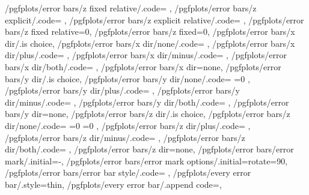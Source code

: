 {	/pgfplots/error bars/z fixed relative/.code=		\def\pgfplots@errorbars@zrel{#1}\def\pgfplots@errorbars@zmode{1},
	/pgfplots/error bars/z explicit/.code=			\def\pgfplots@errorbars@zmode{2},
	/pgfplots/error bars/z explicit relative/.code=	\def\pgfplots@errorbars@zmode{3},
	/pgfplots/error bars/z fixed relative=0,
	/pgfplots/error bars/z fixed=0,
	/pgfplots/error bars/x dir/.is choice,
	/pgfplots/error bars/x dir/none/.code={%
		\def\pgfplots@errorbars@xdirection{0}%
		\ifnum{}
			\ifnum{}
				\pgfplots@errorbars@enabledfalse
			\fi
		\fi
	},
	/pgfplots/error bars/x dir/plus/.code=				\def\pgfplots@errorbars@xdirection{1}\pgfplots@errorbars@enabledtrue,
	/pgfplots/error bars/x dir/minus/.code=				\def\pgfplots@errorbars@xdirection{2}\pgfplots@errorbars@enabledtrue,
	/pgfplots/error bars/x dir/both/.code=				\def\pgfplots@errorbars@xdirection{3}\pgfplots@errorbars@enabledtrue,
	/pgfplots/error bars/x dir=none,
	/pgfplots/error bars/y dir/.is choice,
	/pgfplots/error bars/y dir/none/.code={%
		\def\pgfplots@errorbars@ydirection{0}%
		\ifnum\pgfplots@errorbars@xdirection=0
			\ifnum{}
				\pgfplots@errorbars@enabledfalse
			\fi
		\fi
	},
	/pgfplots/error bars/y dir/plus/.code=				\def\pgfplots@errorbars@ydirection{1}\pgfplots@errorbars@enabledtrue,
	/pgfplots/error bars/y dir/minus/.code=				\def\pgfplots@errorbars@ydirection{2}\pgfplots@errorbars@enabledtrue,
	/pgfplots/error bars/y dir/both/.code=				\def\pgfplots@errorbars@ydirection{3}\pgfplots@errorbars@enabledtrue,
	/pgfplots/error bars/y dir=none,
	/pgfplots/error bars/z dir/.is choice,
	/pgfplots/error bars/z dir/none/.code={%
		\def\pgfplots@errorbars@zdirection{0}%
		\ifnum\pgfplots@errorbars@xdirection=0
			\ifnum\pgfplots@errorbars@ydirection=0
				\pgfplots@errorbars@enabledfalse
			\fi
		\fi
	},
	/pgfplots/error bars/z dir/plus/.code=				\def\pgfplots@errorbars@zdirection{1}\pgfplots@errorbars@enabledtrue,
	/pgfplots/error bars/z dir/minus/.code=				\def\pgfplots@errorbars@zdirection{2}\pgfplots@errorbars@enabledtrue,
	/pgfplots/error bars/z dir/both/.code=				\def\pgfplots@errorbars@zdirection{3}\pgfplots@errorbars@enabledtrue,
	/pgfplots/error bars/z dir=none,
	/pgfplots/error bars/error mark/.initial={-},
	/pgfplots/error bars/error mark options/.initial={rotate=90},
	/pgfplots/error bars/error bar style/.code={%
	},
	/pgfplots/every error bar/.style={thin},
	/pgfplots/every error bar/.append code={},
}
